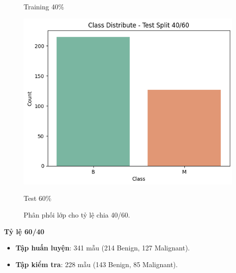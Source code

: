 \begin{figure}[h!]
\begin{minipage}[b]{0.32\linewidth}
		\caption{Training 40\%}
		\label{fig:train}
	\end{minipage}%
	\hfill
	\begin{minipage}[b]{0.32\linewidth}
		\centering
		\includegraphics[width=\linewidth]{figures/dataset1/1.3.png}
		\caption{Test 60\%}
		\label{fig:test}
	\end{minipage}
	\caption{Phân phối lớp cho tỷ lệ chia 40/60.}
	\label{fig:split_40_60}
\end{figure}




\textbf{Tỷ lệ 60/40}

\begin{itemize}
	\item \textbf{Tập huấn luyện}: 341 mẫu (214 Benign, 127 Malignant).
	\item \textbf{Tập kiểm tra}: 228 mẫu (143 Benign, 85 Malignant).
\end{itemize}

